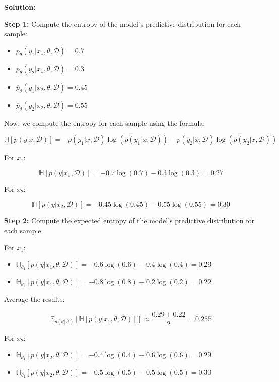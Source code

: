 \documentclass[
  letterpaper,
  numbers=noenddot,
  DIV=11,
  oneside]{scrreprt}
\providecommand{\tightlist}{%
  \setlength{\itemsep}{0pt}\setlength{\parskip}{0pt}}\usepackage{longtable,booktabs,array}
\theoremstyle{remark}
\begin{document}
\textbf{Solution:}

\textbf{Step 1:} Compute the entropy of the model's predictive
distribution for each sample:

\begin{itemize}
\tightlist
\item
  \(\overline{p}_{\theta}(y_1|x_1, \theta, \mathcal{D}) = 0.7\)
\item
  \(\overline{p}_{\theta}(y_2|x_1, \theta, \mathcal{D}) = 0.3\)
\item
  \(\overline{p}_{\theta}(y_1|x_2, \theta, \mathcal{D}) = 0.45\)
\item
  \(\overline{p}_{\theta}(y_2|x_2, \theta, \mathcal{D}) = 0.55\)
\end{itemize}

Now, we compute the entropy for each sample using the formula:

\[
\mathbb{H}[p(y|x, \mathcal{D})] = - p(y_1|x, \mathcal{D}) \log(p(y_1|x, \mathcal{D})) - p(y_2|x, \mathcal{D}) \log(p(y_2|x, \mathcal{D}))
\]

For \(x_1\):

\[
\mathbb{H}[p(y|x_1, \mathcal{D})] = - 0.7 \log(0.7) - 0.3 \log(0.3) = 0.27
\]

For \(x_2\):

\[
\mathbb{H}[p(y|x_2, \mathcal{D})] = - 0.45 \log(0.45) - 0.55 \log(0.55) = 0.30
\]

\textbf{Step 2:} Compute the expected entropy of the model's predictive
distribution for each sample.

For \(x_1\):

\begin{itemize}
\tightlist
\item
  \(\mathbb{H}_{\theta_1}[p(y|x_1, \theta, \mathcal{D})] = -0.6 \log(0.6) - 0.4 \log(0.4) = 0.29\)
\item
  \(\mathbb{H}_{\theta_2}[p(y|x_1, \theta, \mathcal{D})] = -0.8 \log(0.8) - 0.2 \log(0.2) = 0.22\)
\end{itemize}

Average the results:

\[
\mathbb{E}_{p(\theta|\mathcal{D})}[\mathbb{H}[p(y|x_1, \theta, \mathcal{D})]] \approx \frac{0.29 + 0.22}{2} = 0.255
\]

For \(x_2\):

\begin{itemize}
\tightlist
\item
  \(\mathbb{H}_{\theta_1}[p(y|x_2, \theta, \mathcal{D})] = -0.4 \log(0.4) - 0.6 \log(0.6) = 0.29\)
\item
  \(\mathbb{H}_{\theta_2}[p(y|x_2, \theta, \mathcal{D})] = -0.5 \log(0.5) - 0.5 \log(0.5) = 0.30\)
\end{itemize}
\end{document}

